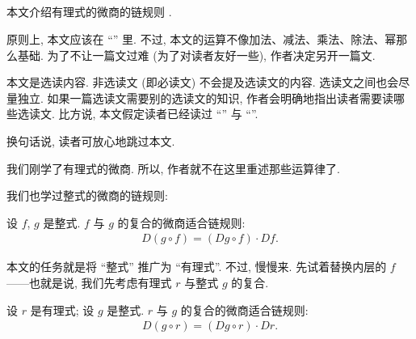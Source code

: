 \subsection*{\ChainRuleOfDerivativesOfRationalExpressions}
\markright{\ChainRuleOfDerivativesOfRationalExpressions}

本文介绍有理式的微商的链规则 .

原则上, 本文应该在 ``\OperationsOnRationalExprsssions'' 里. 不过, 本文的运算不像加法、减法、乘法、除法、幂那么基础. 为了不让一篇文过难 (为了对读者友好一些), 作者决定另开一篇文.

本文是选读内容. 非选读文 (即必读文) 不会提及选读文的内容. 选读文之间也会尽量独立. 如果一篇选读文需要别的选读文的知识, 作者会明确地指出读者需要读哪些选读文. 比方说, 本文假定读者已经读过 ``\CompositionOfRationalExpressions'' 与 ``\DerivativesOfRationalExpressions''.

换句话说, 读者可放心地跳过本文.

\myLine

我们刚学了有理式的微商. 所以, 作者就不在这里重述那些运算律了.

我们也学过整式的微商的链规则:

\begin{proposition}
    设 $f$, $g$ 是整式. $f$ 与 $g$ 的复合的微商适合链规则:
    \begin{align*}
        D(g \circ f) = (Dg \circ f) \cdot Df.
    \end{align*}
\end{proposition}

本文的任务就是将 ``整式'' 推广为 ``有理式''. 不过, 慢慢来. 先试着替换内层的 $f$——也就是说, 我们先考虑有理式 $r$ 与整式 $g$ 的复合.

\begin{proposition}
    设 $r$ 是有理式; 设 $g$ 是整式. $r$ 与 $g$ 的复合的微商适合链规则:
    \begin{align*}
        D(g \circ r) = (Dg \circ r) \cdot Dr.
    \end{align*}
\end{proposition}

